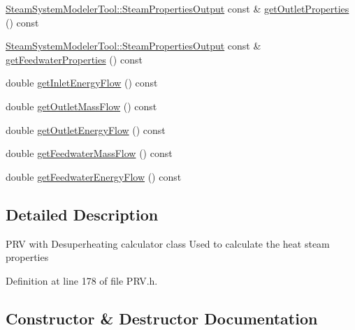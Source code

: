 \begin{DoxyCompactItemize}
\hyperlink{struct_steam_system_modeler_tool_1_1_steam_properties_output}{Steam\+System\+Modeler\+Tool\+::\+Steam\+Properties\+Output} const  \& \hyperlink{class_prv_with_desuperheating_a2eaa4bdad3dc9b81b2128f5c4bd2f5e8}{get\+Outlet\+Properties} () const
\item 
\hyperlink{struct_steam_system_modeler_tool_1_1_steam_properties_output}{Steam\+System\+Modeler\+Tool\+::\+Steam\+Properties\+Output} const  \& \hyperlink{class_prv_with_desuperheating_a8f4594109bda9bc4030c23cee9841fa8}{get\+Feedwater\+Properties} () const
\item 
double \hyperlink{class_prv_with_desuperheating_a97e33f978d78c0e26d6b38a02d4b122b}{get\+Inlet\+Energy\+Flow} () const
\item 
double \hyperlink{class_prv_with_desuperheating_a848a898a392dd7abfb030d0ca1653454}{get\+Outlet\+Mass\+Flow} () const
\item 
double \hyperlink{class_prv_with_desuperheating_aa6e9bbb28c565ba8f7770f69ace33ab3}{get\+Outlet\+Energy\+Flow} () const
\item 
double \hyperlink{class_prv_with_desuperheating_a9bd8ee7d5b563110a7279102352b8f4d}{get\+Feedwater\+Mass\+Flow} () const
\item 
double \hyperlink{class_prv_with_desuperheating_a42945a77fcdbaf1e1844c444c696f8b0}{get\+Feedwater\+Energy\+Flow} () const
\end{DoxyCompactItemize}


\subsection{Detailed Description}
P\+RV with Desuperheating calculator class Used to calculate the heat steam properties 

Definition at line 178 of file P\+R\+V.\+h.



\subsection{Constructor \& Destructor Documentation}
\mbox{\label{class_prv_with_desuperheating_adfd7f6866e8b953dcc41e51bb5b31b58}} 
